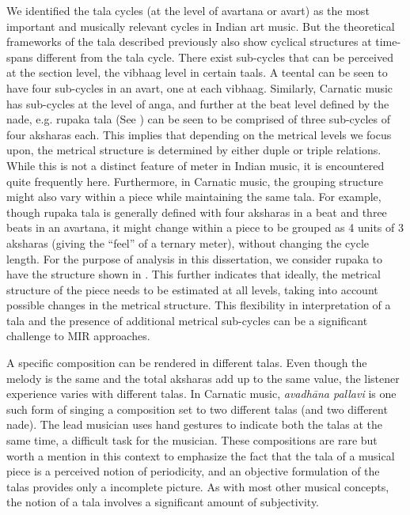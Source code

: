 We identified the \gls{tala} cycles (at the level of \gls{avartana} or \gls{avart}) as the most important and musically relevant cycles in Indian art music. But the theoretical frameworks of the \gls{tala} described previously also show cyclical structures at time-spans different from the \gls{tala} cycle. There exist sub-cycles that can be perceived at the section level, the \gls{vibhaag} level in certain \glspl{taal}. A \gls{teental} can be seen to have four sub-cycles in an \gls{avart}, one at each \gls{vibhaag}. Similarly, Carnatic music has sub-cycles at the level of \gls{anga}, and further at the beat level defined by the \gls{nade}, e.g. \gls{rupaka} \gls{tala} (See ) can be seen to be comprised of three sub-cycles of four \glspl{akshara} each. This implies that depending on the metrical levels we focus upon, the metrical structure is determined by either duple or triple relations. While this is not a distinct feature of meter in Indian music, it is encountered quite frequently here. Furthermore, in Carnatic music, the grouping structure might also vary within a piece while maintaining the same \gls{tala}. For example, though \gls{rupaka} \gls{tala} is generally defined with four \glspl{akshara} in a beat and three beats in an \gls{avartana}, it might change within a piece to be grouped as 4 units of 3 \glspl{akshara} (giving the ``feel'' of a ternary meter), without changing the cycle length. For the purpose of analysis in this dissertation, we consider \gls{rupaka} to have the structure shown in . This further indicates that ideally, the metrical structure of the piece needs to be estimated at all levels, taking into account possible changes in the metrical structure. This flexibility in interpretation of a \gls{tala} and the presence of additional metrical sub-cycles can be a significant challenge to \gls{MIR} approaches. 

A specific composition can be rendered in different \glspl{tala}. Even though the melody is the same and the total \glspl{akshara} add up to the same value, the listener experience varies with different \glspl{tala}. In Carnatic music, \emph{avadhāna pallavi} is one such form of singing a composition set to two different \glspl{tala} (and two different \gls{nade}). The lead musician uses hand gestures to indicate both the \glspl{tala} at the same time, a difficult task for the musician. These compositions are rare but worth a mention in this context to emphasize the fact that the \gls{tala} of a musical piece is a perceived notion of periodicity, and an objective formulation of the \glspl{tala} provides only a incomplete picture. As with most other musical concepts, the notion of a \gls{tala} involves a significant amount of subjectivity.

